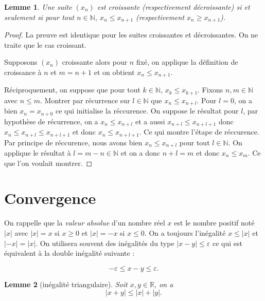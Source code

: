\documentclass[
]{book}
\newtheorem{lemma}{Lemme}[chapter]
\theoremstyle{definition}
\theoremstyle{definition}
\theoremstyle{definition}
\theoremstyle{definition}
\theoremstyle{remark}
\begin{document}
\begin{lemma}
Une suite \((x_n)\) est croissante (respectivement décroissante) si et seulement si pour tout \(n\in\mathbb{N}\), \(x_n\leq x_{n+1}\) (respectivement \(x_n\geq x_{n+1}\)).
\end{lemma}

\begin{proof}
La preuve est identique pour les suites croissantes et décroissantes. On ne traite que le cas croissant.

Supposons \((x_n)\) croissante alors pour \(n\) fixé, on applique la définition de croissance à \(n\) et \(m=n+1\) et on obtient \(x_n\leq x_{n+1}\).

Réciproquement, on suppose que pour tout \(k\in \mathbb{N}\), \(x_k\leq x_{k+1}\). Fixons \(n,m\in\mathbb{N}\) avec \(n\leq m\). Montrer par récurrence sur \(l\in\mathbb{N}\) que \(x_n\leq x_{n+l}\). Pour \(l=0\), on a bien \(x_n=x_{n+0}\) ce qui initialise la réccurence. On suppose le résultat pour \(l\), par hypothèse de récurrence, on a \(x_n\leq x_{n+l}\) et a aussi \(x_{n+l}\leq x_{n+l+1}\) donc \(x_n\leq x_{n+l}\leq x_{n+l+1}\) et donc \(x_n\leq x_{n+l+1}\). Ce qui montre l'étape de réccurence. Par principe de réccurence, nous avons bien \(x_n\leq x_{n+l}\) pour tout \(l\in\mathbb{N}\). On applique le résultat à \(l=m-n\in\mathbb{N}\) et on a donc \(n+l=m\) et donc \(x_n\leq x_m\). Ce que l'on voulait montrer.
\end{proof}

\hypertarget{convergence}{%
\section{Convergence}\label{convergence}}

On rappelle que la \emph{valeur absolue} d'un nombre réel \(x\) est le nombre positif noté \(|x|\) avec \(|x|=x\) si \(x\geq0\) et \(|x|=-x\) si \(x\leq0\). On a toujours l'inégalité \(x\leq|x|\) et \(|-x|=|x|\). On utilisera souvent des inégalités du type \(|x-y|\leq \varepsilon\) ce qui est équivalent à la double inégalité suivante :

\[-\varepsilon\leq x-y\leq \varepsilon.\]

\begin{lemma}[inégalité triangulaire]
Soit \(x,y\in\mathbb{R}\), on a \[|x+y|\leq |x|+|y|.\]
\end{lemma}
\end{document}
